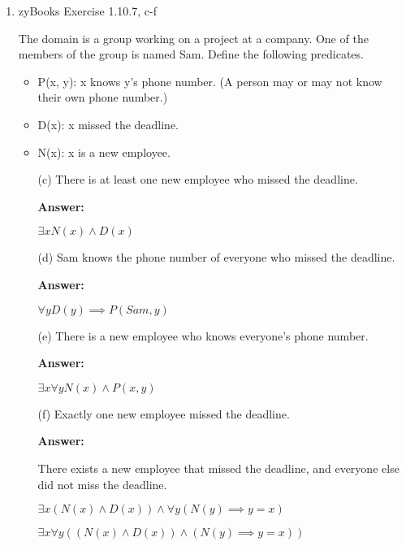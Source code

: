 \documentclass[12pt]{extreport}
\newcommand{\answer}[0]{\medskip \textbf{Answer:} \medskip}
\begin{document}
\begin{enumerate}
    \item zyBooks Exercise 1.10.7, c-f
    
    The domain is a group working on a project at a company. One of the members of the group is named Sam. Define the following predicates.

    \begin{itemize}
        \item P(x, y): x knows y's phone number. (A person may or may not know their own phone number.)
        \item D(x): x missed the deadline.
        \item N(x): x is a new employee.
    \end{itemize}

        \begin{enumerate}
            
            \item[(c)] There is at least one new employee who missed the deadline.
            
                \answer

                \( \exists x N(x) \land D(x) \)

            \item[(d)] Sam knows the phone number of everyone who missed the deadline.
            
                \answer

                \( \forall y D(y) \implies P(Sam, y) \)

            \item[(e)] There is a new employee who knows everyone's phone number.
            
                \answer

                \( \exists x \forall y N(x) \land P(x, y) \)

            \item[(f)] Exactly one new employee missed the deadline.
            
                \answer

                There exists a new employee that missed the deadline, and everyone else did not miss the deadline.

                \( \exists x (N(x) \land D(x)) \land \forall y (N(y) \implies y = x) \)

                \( \exists x \forall y ((N(x) \land D(x)) \land (N(y) \implies y = x)) \)

        \end{enumerate}


\end{enumerate}
\end{document}
